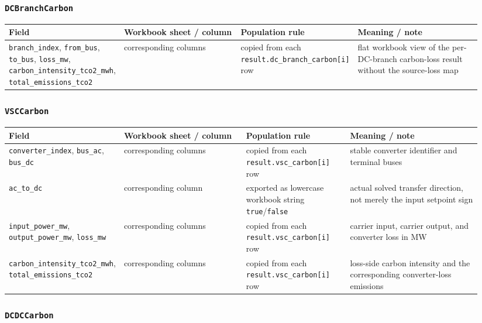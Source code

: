 \subsubsection*{\texttt{DCBranchCarbon}}

\begin{longtable}{@{}L{0.18\linewidth}L{0.26\linewidth}L{0.22\linewidth}L{0.28\linewidth}@{}}
\toprule
Field & Workbook sheet / column & Population rule & Meaning / note \\
\midrule
\endhead
\texttt{branch\_index}, \texttt{from\_bus}, \texttt{to\_bus}, \texttt{loss\_mw}, \texttt{carbon\_intensity\_tco2\_mwh}, \texttt{total\_emissions\_tco2} & corresponding columns & copied from each \texttt{result.dc\_branch\_carbon[i]} row & flat workbook view of the per-DC-branch carbon-loss result without the source-loss map \\
\bottomrule
\end{longtable}

\subsubsection*{\texttt{VSCCarbon}}

\begin{longtable}{@{}L{0.18\linewidth}L{0.26\linewidth}L{0.22\linewidth}L{0.28\linewidth}@{}}
\toprule
Field & Workbook sheet / column & Population rule & Meaning / note \\
\midrule
\endhead
\texttt{converter\_index}, \texttt{bus\_ac}, \texttt{bus\_dc} & corresponding columns & copied from each \texttt{result.vsc\_carbon[i]} row & stable converter identifier and terminal buses \\
\texttt{ac\_to\_dc} & corresponding column & exported as lowercase workbook string \texttt{true}/\texttt{false} & actual solved transfer direction, not merely the input setpoint sign \\
\texttt{input\_power\_mw}, \texttt{output\_power\_mw}, \texttt{loss\_mw} & corresponding columns & copied from each \texttt{result.vsc\_carbon[i]} row & carrier input, carrier output, and converter loss in MW \\
\texttt{carbon\_intensity\_tco2\_mwh}, \texttt{total\_emissions\_tco2} & corresponding columns & copied from each \texttt{result.vsc\_carbon[i]} row & loss-side carbon intensity and the corresponding converter-loss emissions \\
\bottomrule
\end{longtable}

\subsubsection*{\texttt{DCDCCarbon}}


